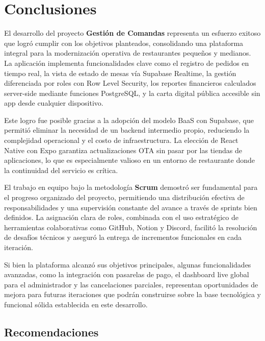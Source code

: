 \chapter{Conclusiones}

El desarrollo del proyecto \textbf{Gestión de Comandas} representa un esfuerzo
exitoso que logró cumplir con los objetivos planteados, consolidando una plataforma
integral para la modernización operativa de restaurantes pequeños y medianos. La
aplicación implementa funcionalidades clave como el registro de pedidos en tiempo
real, la vista de estado de mesas vía Supabase Realtime, la gestión diferenciada por
roles con Row Level Security, los reportes financieros calculados server-side mediante
funciones PostgreSQL, y la carta digital pública accesible sin app desde cualquier
dispositivo.

Este logro fue posible gracias a la adopción del modelo BaaS con Supabase, que
permitió eliminar la necesidad de un backend intermedio propio, reduciendo la
complejidad operacional y el costo de infraestructura. La elección de React Native
con Expo garantiza actualizaciones OTA sin pasar por las tiendas de aplicaciones,
lo que es especialmente valioso en un entorno de restaurante donde la continuidad
del servicio es crítica.

El trabajo en equipo bajo la metodología \textbf{Scrum} demostró ser fundamental
para el progreso organizado del proyecto, permitiendo una distribución efectiva de
responsabilidades y una supervisión constante del avance a través de sprints bien
definidos. La asignación clara de roles, combinada con el uso estratégico de
herramientas colaborativas como GitHub, Notion y Discord, facilitó la resolución
de desafíos técnicos y aseguró la entrega de incrementos funcionales en cada
iteración.

Si bien la plataforma alcanzó sus objetivos principales, algunas funcionalidades
avanzadas, como la integración con pasarelas de pago, el dashboard live global
para el administrador y las cancelaciones parciales, representan oportunidades de
mejora para futuras iteraciones que podrán construirse sobre la base tecnológica
y funcional sólida establecida en este desarrollo.

\section{Recomendaciones}

